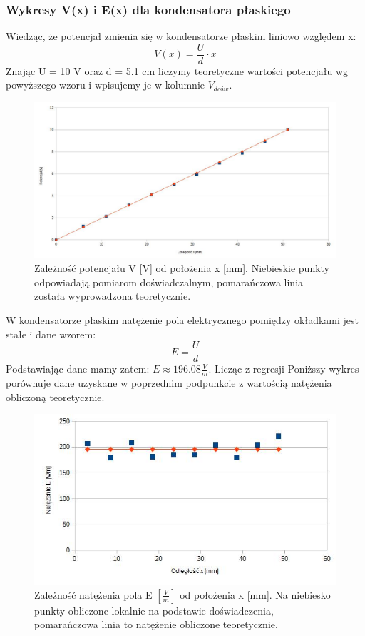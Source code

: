 \documentclass{article}
\begin{document}
\subsubsection{Wykresy V(x) i E(x) dla kondensatora płaskiego}
Wiedząc, że potencjał zmienia się w kondensatorze płaskim liniowo względem x:
\begin{equation}
	V(x) = \frac{U}{d} \cdot x
\end{equation}
Znając U = 10 V oraz d = 5.1 cm liczymy teoretyczne wartości potencjału wg powyższego wzoru i wpisujemy je w kolumnie $V_{dośw}$. \newline

\begin{figure}
	\centering
	\includegraphics[scale=0.42]{ch01}
	\caption{Zależność potencjału V [V] od położenia x [mm]. Niebieskie punkty odpowiadają pomiarom doświadczalnym, pomarańczowa linia została wyprowadzona teoretycznie.}
\end{figure}

W kondensatorze płaskim natężenie pola elektrycznego pomiędzy okładkami jest stałe i dane wzorem:
\begin{equation}
	E = \frac{U}{d}
\end{equation}
Podstawiając dane mamy zatem: $E \approx 196.08 \frac{V}{m} $.
Licząc z regresji 
Poniższy wykres porównuje dane uzyskane w poprzednim podpunkcie z wartością natężenia obliczoną teoretycznie.

\begin{figure}[h!]
	\centering
	\includegraphics[scale=0.55]{ch02}
	\caption{Zależność natężenia pola E $[\frac{V}{m}]$ od położenia x [mm]. Na niebiesko punkty obliczone lokalnie na podstawie doświadczenia, pomarańczowa linia to natężenie obliczone teoretycznie.}
\end{figure}
\end{document}
